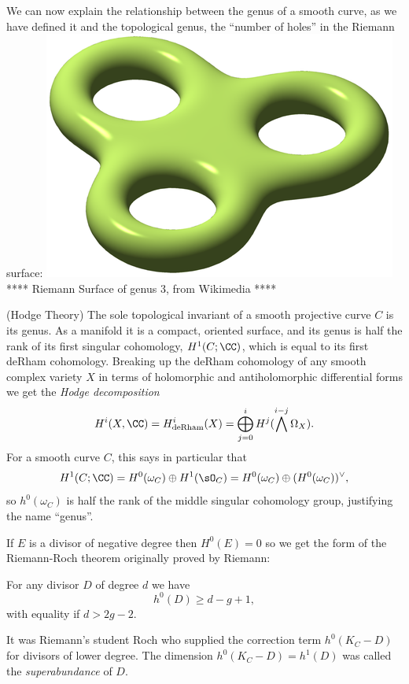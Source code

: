 We can now explain the relationship between the genus of a smooth curve, as we have defined it and the 
topological genus, the ``number of holes'' in the Riemann surface:
\includegraphics[scale = 1]{RiemannSurface}
**** Riemann Surface of genus 3, from Wikimedia ****

\begin{fact} (Hodge Theory)
The sole topological invariant of a smooth projective curve $C$ is its genus. As a manifold it is a compact, oriented surface, and its genus is half the rank of its first singular cohomology, $H^{1}(C; \CC)$, which is equal to its first deRham cohomology.
Breaking up the deRham cohomology of any smooth complex variety $X$ in terms of holomorphic and antiholomorphic differential
forms we get the \emph{Hodge decomposition}
$$
H^i(X,\CC) = H^i_{\rm de Rham}(X) = \bigoplus_{j=0}^i H^j(\bigwedge^{i-j} \Omega_X).
$$
For a smooth curve $C$, this says in  particular that
$$
H^1(C; \CC) = H^0(\omega_C)\oplus H^1(\sO_C) = H^0(\omega_C)\oplus (H^0(\omega_C))^\vee, 
$$
so $ h^0(\omega_C)$ is half the rank of the middle singular cohomology group, justifying the name ``genus''.
\end{fact}


If $E$ is a divisor of negative degree then $H^0(E) = 0$ so we get the form of the Riemann-Roch theorem
originally proved by Riemann:

\begin{corollary}\label{nonspecial RR}
For any divisor $D$ of degree $d$ we have
$$
h^0(D) \geq d - g + 1,
$$
with equality if $d > 2g-2$.
\end{corollary}
It was Riemann's student Roch  who supplied the correction term $h^0(K_C - D)$ for divisors of lower degree.
The dimension $h^0(K_C-D) = h^1(D)$ was called the \emph{superabundance} of $D$.

